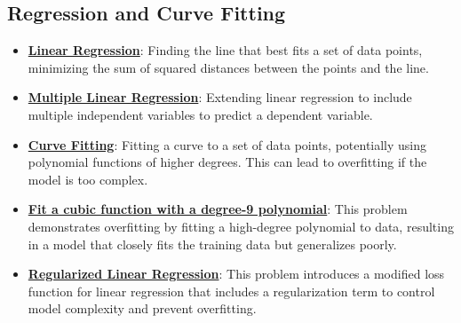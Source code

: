\documentclass{article}%
\begin{document}
%
\subsection{Regression and Curve Fitting}%
\label{subsec:RegressionandCurveFitting}%
\begin{itemize}[leftmargin=*]%
\item \href{https://purdue.brightspace.com/d2l/common/assets/pdfjs-d2l-dist/1.0.14-legacy/web/viewer.html?file=\%2Fcontent\%2Fenforced\%2F1095467-wl.202510.CS.24300.001\%2F05L2-ML Basics.pdf\%3Fou\%3D1095467\&lang=en-us\&container=d2l-fileviewer-rendered-pdf\&fullscreen=d2l-fileviewer-rendered-pdf-dialog\&height=667#page=6}{\textbf{Linear Regression}}: Finding the line that best fits a set of data points, minimizing the sum of squared distances between the points and the line.%
\item \href{https://purdue.brightspace.com/d2l/common/assets/pdfjs-d2l-dist/1.0.14-legacy/web/viewer.html?file=\%2Fcontent\%2Fenforced\%2F1095467-wl.202510.CS.24300.001\%2F05L2-ML Basics.pdf\%3Fou\%3D1095467\&lang=en-us\&container=d2l-fileviewer-rendered-pdf\&fullscreen=d2l-fileviewer-rendered-pdf-dialog\&height=667#page=11}{\textbf{Multiple Linear Regression}}: Extending linear regression to include multiple independent variables to predict a dependent variable.%
\item \href{https://purdue.brightspace.com/d2l/common/assets/pdfjs-d2l-dist/1.0.14-legacy/web/viewer.html?file=\%2Fcontent\%2Fenforced\%2F1095467-wl.202510.CS.24300.001\%2F05L2-ML Basics.pdf\%3Fou\%3D1095467\&lang=en-us\&container=d2l-fileviewer-rendered-pdf\&fullscreen=d2l-fileviewer-rendered-pdf-dialog\&height=667#page=13}{\textbf{Curve Fitting}}: Fitting a curve to a set of data points, potentially using polynomial functions of higher degrees. This can lead to overfitting if the model is too complex.%
\item \href{https://purdue.brightspace.com/d2l/common/assets/pdfjs-d2l-dist/1.0.14-legacy/web/viewer.html?file=\%2Fcontent\%2Fenforced\%2F1095467-wl.202510.CS.24300.001\%2F10L1-CrossValidation.pdf\%3Fou\%3D1095467\&lang=en-us\&container=d2l-fileviewer-rendered-pdf\&fullscreen=d2l-fileviewer-rendered-pdf-dialog\&height=667#page=15}{\textbf{Fit a cubic function with a degree-9 polynomial}}: This problem demonstrates overfitting by fitting a high-degree polynomial to data, resulting in a model that closely fits the training data but generalizes poorly.%
\item \href{https://purdue.brightspace.com/d2l/common/assets/pdfjs-d2l-dist/1.0.14-legacy/web/viewer.html?file=\%2Fcontent\%2Fenforced\%2F1095467-wl.202510.CS.24300.001\%2F10L1-CrossValidation.pdf\%3Fou\%3D1095467\&lang=en-us\&container=d2l-fileviewer-rendered-pdf\&fullscreen=d2l-fileviewer-rendered-pdf-dialog\&height=667#page=17}{\textbf{Regularized Linear Regression}}: This problem introduces a modified loss function for linear regression that includes a regularization term to control model complexity and prevent overfitting.%
\end{itemize}
\end{document}
